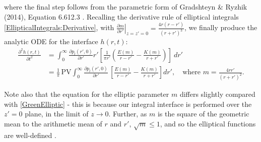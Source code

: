 \documentclass[11pt,a4paper]{article}
\begin{document}
	where the final step follows from the parametric form of Gradshteyn \& Ryzhik (2014), Equation 6.612.3 . Recalling the derivative rule of elliptical integrals \eqref{EllipticalIntegrals:Derivative}, with $\left. \frac{\partial m}{\partial r'} \right|_{z=z'=0} = \frac{4r(r-r')}{(r+r')^3}$, we finally produce the analytic ODE for the interface $h(r,t)$:
	\begin{equation}
		\label{BoundaryIntegral}
		\begin{aligned}
			\frac{\partial^2 h(r, t)}{\partial t^2}	&= \int^\infty _0 \frac{\partial p_l(r',0)}{\partial r'} r' \left[ \frac{1}{\pi r'} \left( \frac{E(m)}{r-r'} - \frac{K(m)}{r+r'} \right) \right]\ dr' \\
			&= \frac{1}{\pi} \, \text{PV} \int_0^\infty \frac{\partial p_l(r',0)}{\partial r'} \, \left[\frac{E(m)}{r - r'} - \frac{K(m)}{r + r'}\right] dr', \quad \text{where } m = \frac{4rr'}{(r+r')^2}.
		\end{aligned}
	\end{equation}
	
	Note also that the equation for the elliptic parameter $m$ differs slightly compared with \eqref{GreenElliptic} - this is because our integral interface is performed over the $z'=0$ plane, in the limit of $z \to 0$. Further, as $m$ is the square of the geometric mean to the arithmetic mean of $r$ and $r'$, $\sqrt{m} \le 1$, and so the elliptical functions are well-defined .
\end{document}
